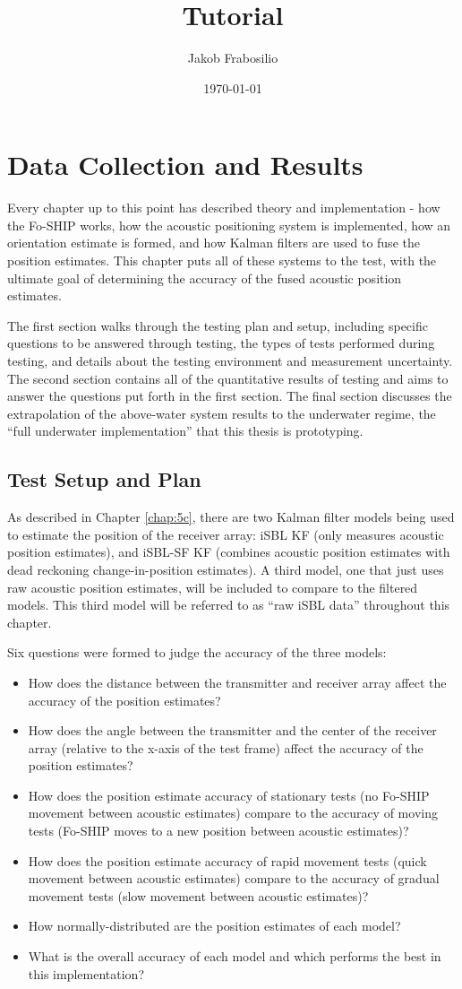 \documentclass[12pt,a4paper]{report}
\title{Tutorial}
\author{Jakob Frabosilio}
\date{\today}
\begin{document}
\chapter{Data Collection and Results} \label{chap:6c}
Every chapter up to this point has described theory and implementation - how the Fo-SHIP works, how the acoustic positioning system is implemented, how an orientation estimate is formed, and how Kalman filters are used to fuse the position estimates. This chapter puts all of these systems to the test, with the ultimate goal of determining the accuracy of the fused acoustic position estimates.

The first section walks through the testing plan and setup, including specific questions to be answered through testing, the types of tests performed during testing, and details about the testing environment and measurement uncertainty. The second section contains all of the quantitative results of testing and aims to answer the questions put forth in the first section. The final section discusses the extrapolation of the above-water system results to the underwater regime, the “full underwater implementation” that this thesis is prototyping.

\section{Test Setup and Plan} \label{sec:6s1}
As described in Chapter \ref{chap:5c}, there are two Kalman filter models being used to estimate the position of the receiver array: iSBL KF (only measures acoustic position estimates), and iSBL-SF KF (combines acoustic position estimates with dead reckoning change-in-position estimates). A third model, one that just uses raw acoustic position estimates, will be included to compare to the filtered models. This third model will be referred to as “raw iSBL data” throughout this chapter.

Six questions were formed to judge the accuracy of the three models:
\begin{itemize}[noitemsep,topsep=0pt,]
	\item How does the distance between the transmitter and receiver array affect the accuracy of the position estimates?
	\item How does the angle between the transmitter and the center of the receiver array (relative to the x-axis of the test frame) affect the accuracy of the position estimates?
	\item How does the position estimate accuracy of stationary tests (no Fo-SHIP movement between acoustic estimates) compare to the accuracy of moving tests (Fo-SHIP moves to a new position between acoustic estimates)?
	\item How does the position estimate accuracy of rapid movement tests (quick movement between acoustic estimates) compare to the accuracy of gradual movement tests (slow movement between acoustic estimates)?
	\item How normally-distributed are the position estimates of each model?
	\item What is the overall accuracy of each model and which performs the best in this implementation?
\end{itemize}
\end{document}
